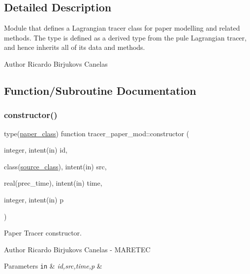 \subsection{Detailed Description}
Module that defines a Lagrangian tracer class for paper modelling and related methods. The type is defined as a derived type from the pule Lagrangian tracer, and hence inherits all of it\textquotesingle{}s data and methods. 

\begin{DoxyAuthor}{Author}
Ricardo Birjukovs Canelas 
\end{DoxyAuthor}


\subsection{Function/\+Subroutine Documentation}
\mbox{\label{namespacetracer__paper__mod_ab53f84300a313c395a5c3535f17022bb}} 
\subsubsection{\texorpdfstring{constructor()}{constructor()}}
{\footnotesize\ttfamily type(\mbox{\hyperlink{structtracer__paper__mod_1_1paper__class}{paper\+\_\+class}}) function tracer\+\_\+paper\+\_\+mod\+::constructor (\begin{DoxyParamCaption}\item[{integer, intent(in)}]{id,  }\item[{class(\mbox{\hyperlink{structsources__mod_1_1source__class}{source\+\_\+class}}), intent(in)}]{src,  }\item[{real(prec\+\_\+time), intent(in)}]{time,  }\item[{integer, intent(in)}]{p }\end{DoxyParamCaption})\hspace{0.3cm}{\ttfamily [private]}}



Paper Tracer constructor. 

\begin{DoxyAuthor}{Author}
Ricardo Birjukovs Canelas -\/ M\+A\+R\+E\+T\+EC 
\end{DoxyAuthor}

\begin{DoxyParams}[1]{Parameters}
\mbox{\tt in}  & {\em id,src,time,p} & \\
\hline
\end{DoxyParams}


